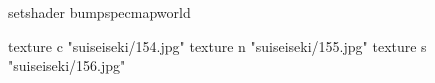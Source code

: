 setshader bumpspecmapworld

    texture c "suiseiseki/154.jpg"
    texture n "suiseiseki/155.jpg"
    texture s "suiseiseki/156.jpg"
